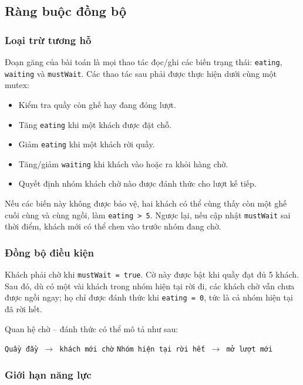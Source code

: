 \subsection{Ràng buộc đồng bộ}

\subsubsection*{Loại trừ tương hỗ}

Đoạn găng của bài toán là mọi thao tác đọc/ghi các biến trạng thái:
\texttt{eating}, \texttt{waiting} và \texttt{mustWait}. Các thao tác sau phải
được thực hiện dưới cùng một mutex:

\begin{itemize}
    \item Kiểm tra quầy còn ghế hay đang đóng lượt.
    \item Tăng \texttt{eating} khi một khách được đặt chỗ.
    \item Giảm \texttt{eating} khi một khách rời quầy.
    \item Tăng/giảm \texttt{waiting} khi khách vào hoặc ra khỏi hàng chờ.
    \item Quyết định nhóm khách chờ nào được đánh thức cho lượt kế tiếp.
\end{itemize}

Nếu các biến này không được bảo vệ, hai khách có thể cùng thấy còn một ghế cuối
cùng và cùng ngồi, làm \texttt{eating > 5}. Ngược lại, nếu cập nhật
\texttt{mustWait} sai thời điểm, khách mới có thể chen vào trước nhóm đang chờ.

\subsubsection*{Đồng bộ điều kiện}

Khách phải chờ khi \texttt{mustWait = true}. Cờ này được bật khi quầy đạt đủ
5 khách. Sau đó, dù có một vài khách trong nhóm hiện tại rời đi, các khách chờ
vẫn chưa được ngồi ngay; họ chỉ được đánh thức khi \texttt{eating = 0}, tức là
cả nhóm hiện tại đã rời hết.

Quan hệ chờ -- đánh thức có thể mô tả như sau:

\begin{center}
\texttt{Quầy đầy $\rightarrow$ khách mới chờ}
\qquad
\texttt{Nhóm hiện tại rời hết $\rightarrow$ mở lượt mới}
\end{center}

\subsubsection*{Giới hạn năng lực}

